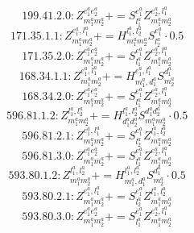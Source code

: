 \documentclass[letterpaper,10pt,fleqn,leqno,onecolumn]{article}
\begin{document}
\begin{equation} \;\;\;\;\;\;  199.41.2.0: Z^{e_{1}^{a}e_{2}^{a}}_{m_{1}^{a}m_{2}^{a}}+=S^{e_{1}^{a}}_{l_{1}^{a}}Z^{e_{2}^{a},l_{1}^{a}}_{m_{1}^{a}m_{2}^{a}} \end{equation}
\begin{equation} \;\;\;\;\;\;  171.35.1.1: Z^{e_{1}^{a},l_{1}^{a}}_{m_{1}^{a}m_{2}^{a}}+=H^{l_{1}^{a},l_{2}^{a}}_{m_{1}^{a}m_{2}^{a}}S^{e_{1}^{a}}_{l_{2}^{a}}\cdot 0.5 \end{equation}
\begin{equation} \;\;\;\;\;\;  171.35.2.0: Z^{e_{1}^{a}e_{2}^{a}}_{m_{1}^{a}m_{2}^{a}}+=S^{e_{1}^{a}}_{l_{1}^{a}}Z^{e_{2}^{a},l_{1}^{a}}_{m_{1}^{a}m_{2}^{a}} \end{equation}
\begin{equation} \;\;\;\;\;\;  168.34.1.1: Z^{e_{1}^{a},l_{1}^{a}}_{m_{1}^{a}m_{2}^{a}}+=H^{e_{1}^{a},l_{1}^{a}}_{m_{1}^{a},d_{1}^{a}}S^{d_{1}^{a}}_{m_{2}^{a}} \end{equation}
\begin{equation} \;\;\;\;\;\;  168.34.2.0: Z^{e_{1}^{a}e_{2}^{a}}_{m_{1}^{a}m_{2}^{a}}+=S^{e_{1}^{a}}_{l_{1}^{a}}Z^{e_{2}^{a},l_{1}^{a}}_{m_{1}^{a}m_{2}^{a}} \end{equation}
\begin{equation} \;\;\;\;\;\;  596.81.1.2: Z^{l_{1}^{a},l_{2}^{a}}_{m_{1}^{a}m_{2}^{a}}+=H^{l_{1}^{a},l_{2}^{a}}_{d_{1}^{a}d_{2}^{a}}S^{d_{1}^{a}d_{2}^{a}}_{m_{1}^{a}m_{2}^{a}}\cdot 0.5 \end{equation}
\begin{equation} \;\;\;\;\;\;  596.81.2.1: Z^{e_{1}^{a},l_{1}^{a}}_{m_{1}^{a}m_{2}^{a}}+=S^{e_{1}^{a}}_{l_{2}^{a}}Z^{l_{1}^{a},l_{2}^{a}}_{m_{1}^{a}m_{2}^{a}} \end{equation}
\begin{equation} \;\;\;\;\;\;  596.81.3.0: Z^{e_{1}^{a}e_{2}^{a}}_{m_{1}^{a}m_{2}^{a}}+=S^{e_{1}^{a}}_{l_{1}^{a}}Z^{e_{2}^{a},l_{1}^{a}}_{m_{1}^{a}m_{2}^{a}} \end{equation}
\begin{equation} \;\;\;\;\;\;  593.80.1.2: Z^{l_{1}^{a},l_{2}^{a}}_{m_{1}^{a}m_{2}^{a}}+=H^{l_{1}^{a},l_{2}^{a}}_{m_{1}^{a},d_{1}^{a}}S^{d_{1}^{a}}_{m_{2}^{a}}\cdot 0.5 \end{equation}
\begin{equation} \;\;\;\;\;\;  593.80.2.1: Z^{e_{1}^{a},l_{1}^{a}}_{m_{1}^{a}m_{2}^{a}}+=S^{e_{1}^{a}}_{l_{2}^{a}}Z^{l_{1}^{a},l_{2}^{a}}_{m_{1}^{a}m_{2}^{a}} \end{equation}
\begin{equation} \;\;\;\;\;\;  593.80.3.0: Z^{e_{1}^{a}e_{2}^{a}}_{m_{1}^{a}m_{2}^{a}}+=S^{e_{1}^{a}}_{l_{1}^{a}}Z^{e_{2}^{a},l_{1}^{a}}_{m_{1}^{a}m_{2}^{a}} \end{equation}
\end{document}
